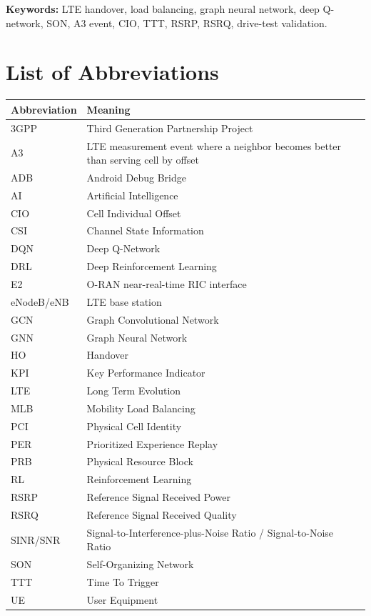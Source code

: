 \documentclass[12pt,a4paper]{report}
\begin{document}
\textbf{Keywords:} LTE handover, load balancing, graph neural network, deep Q-network, SON, A3 event, CIO, TTT, RSRP, RSRQ, drive-test validation.

\chapter*{List of Abbreviations}
\begin{longtable}{ll}
\toprule
\textbf{Abbreviation} & \textbf{Meaning}\\
\midrule
3GPP & Third Generation Partnership Project\\
A3 & LTE measurement event where a neighbor becomes better than serving cell by offset\\
ADB & Android Debug Bridge\\
AI & Artificial Intelligence\\
CIO & Cell Individual Offset\\
CSI & Channel State Information\\
DQN & Deep Q-Network\\
DRL & Deep Reinforcement Learning\\
E2 & O-RAN near-real-time RIC interface\\
eNodeB/eNB & LTE base station\\
GCN & Graph Convolutional Network\\
GNN & Graph Neural Network\\
HO & Handover\\
KPI & Key Performance Indicator\\
LTE & Long Term Evolution\\
MLB & Mobility Load Balancing\\
PCI & Physical Cell Identity\\
PER & Prioritized Experience Replay\\
PRB & Physical Resource Block\\
RL & Reinforcement Learning\\
RSRP & Reference Signal Received Power\\
RSRQ & Reference Signal Received Quality\\
SINR/SNR & Signal-to-Interference-plus-Noise Ratio / Signal-to-Noise Ratio\\
SON & Self-Organizing Network\\
TTT & Time To Trigger\\
UE & User Equipment\\
\bottomrule
\end{longtable}
\end{document}
